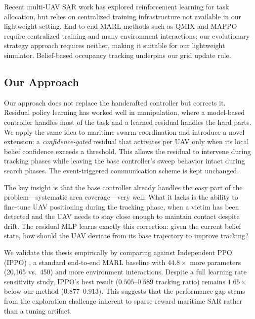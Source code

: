 \documentclass[journal]{IEEEtran}
\begin{document}
Recent multi-UAV SAR work \cite{decentralized_uav_task, uav_sar_marl} has explored
reinforcement learning for task allocation, but relies on centralized training
infrastructure not available in our lightweight setting. End-to-end MARL methods such
as QMIX \cite{qmix} and MAPPO \cite{mappo} require centralized training and many
environment interactions; our evolutionary strategy \cite{es_openai} approach requires
neither, making it suitable for our lightweight simulator. Belief-based occupancy
tracking \cite{belief_propagation_tracking} underpins our grid update rule.

\subsection{Our Approach}

Our approach does not replace the handcrafted controller but corrects it. Residual
policy learning \cite{residual_rl, silver_residual, residual_rl_assembly} has worked well in manipulation, where a
model-based controller handles most of the task and a learned residual handles the
hard parts. We apply the same idea to maritime swarm coordination and introduce a
novel extension: a \emph{confidence-gated} residual that activates per UAV only when
its local belief confidence exceeds a threshold. This allows the residual to intervene
during tracking phases while leaving the base controller's sweep behavior intact
during search phases. The event-triggered communication scheme \cite{event_triggered,
sparse_comm_marl} is kept unchanged.

The key insight is that the base controller already handles the easy part of the
problem---systematic area coverage---very well. What it lacks is the ability to
fine-tune UAV positioning during the tracking phase, when a victim has been detected
and the UAV needs to stay close enough to maintain contact despite drift. The residual
MLP learns exactly this correction: given the current belief state, how should the
UAV deviate from its base trajectory to improve tracking?

We validate this thesis empirically by comparing against Independent PPO (IPPO)
\cite{mappo, ippo_reference}, a standard end-to-end MARL baseline with $44.8\times$ more parameters
(20,165 vs.\ 450) and more environment interactions. Despite a full learning rate
sensitivity study, IPPO's best result ($0.505$--$0.589$ tracking ratio) remains
$1.65\times$ below our method ($0.877$--$0.913$). This suggests that the performance
gap stems from the exploration challenge inherent to sparse-reward
maritime SAR rather than a tuning artifact.
\end{document}
